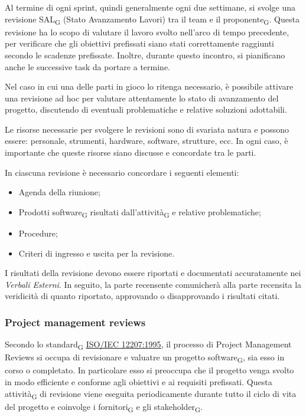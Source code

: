 {{
Al termine di ogni sprint, quindi generalmente ogni due settimane, si svolge una revisione {SAL\textsubscript{G}}
(Stato Avanzamento Lavori) tra il team e il {proponente\textsubscript{G}}. Questa revisione ha lo scopo di valutare il lavoro svolto
nell'arco di tempo precedente, per verificare che gli obiettivi prefissati siano stati correttamente raggiunti secondo le scadenze prefissate.
Inoltre, durante questo incontro, si pianificano anche le successive task da portare a termine.

Nel caso in cui una delle parti in gioco lo ritenga necessario, è possibile attivare una revisione ad hoc per valutare attentamente lo stato
di avanzamento del progetto, discutendo di eventuali problematiche e relative soluzioni adottabili.

Le risorse necessarie per svolgere le revisioni sono di svariata natura e possono essere: personale, strumenti, hardware, software, strutture, ecc.
In ogni caso, è importante che queste risorse siano discusse e concordate tra le parti.

In ciascuna revisione è necessario concordare i seguenti elementi:
\begin{itemize}
    \item Agenda della riunione;
    \item Prodotti {software\textsubscript{G}} risultati dall'{attività\textsubscript{G}} e relative problematiche;
    \item Procedure;
    \item Criteri di ingresso e uscita per la revisione.
\end{itemize}

I risultati della revisione devono essere riportati e documentati accuratamente nei \textit{Verbali Esterni}. In seguito, la parte recensente
comunicherà alla parte recensita la veridicità di quanto riportato, approvando o disapprovando i risultati citati.

\subsubsection{Project management reviews}
Secondo lo {standard\textsubscript{G}} \href{https://www.math.unipd.it/~tullio/IS-1/2009/Approfondimenti/ISO_12207-1995.pdf}{\underline{ISO/IEC 12207:1995}},
il processo di Project Management Reviews si occupa di revisionare e valuatre un progetto {software\textsubscript{G}}, sia esso
in corso o completato. In particolare esso si preoccupa che il progetto venga svolto in modo efficiente e conforme agli obiettivi e ai requisiti 
prefissati. Questa {attività\textsubscript{G}} di revisione viene eseguita periodicamente durante tutto il ciclo di vita del progetto e
coinvolge i {fornitori\textsubscript{G}} e gli {stakeholder\textsubscript{G}}.

}}
